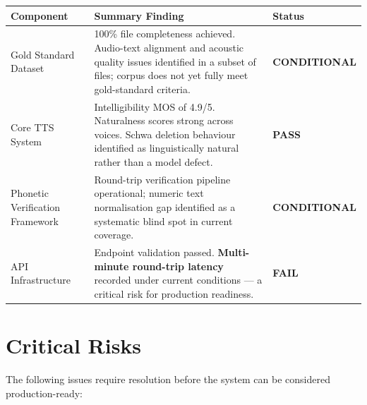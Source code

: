 \documentclass[12pt, a4paper]{article}
\newcommand{\pass}[0]{\textcolor{status-pass}{\textbf{PASS}}}
\newcommand{\conditional}[0]{\textcolor{status-warn}{\textbf{CONDITIONAL}}}
\newcommand{\fail}[0]{\textcolor{status-fail}{\textbf{FAIL}}}
\newcommand{\risk}[1]{\textcolor{status-fail}{\textbf{#1}}}
\begin{document}
\vspace{0.4em}
\begin{center}
\renewcommand{\arraystretch}{1.45}
\begin{tabular}{L{3.8cm} L{6.5cm} C{2.2cm}}
  \toprule
  \textbf{Component} & \textbf{Summary Finding} & \textbf{Status} \\
  \midrule
  Gold Standard Dataset
    & 100\% file completeness achieved. Audio-text alignment and acoustic quality issues identified in a subset of files; corpus does not yet fully meet gold-standard criteria.
    & \conditional \\
  \addlinespace
  Core TTS System
    & Intelligibility MOS of 4.9/5. Naturalness scores strong across voices. Schwa deletion behaviour identified as linguistically natural rather than a model defect.
    & \pass \\
  \addlinespace
  Phonetic Verification Framework
    & Round-trip verification pipeline operational; numeric text normalisation gap identified as a systematic blind spot in current coverage.
    & \conditional \\
  \addlinespace
  API Infrastructure
    & Endpoint validation passed. \risk{Multi-minute round-trip latency} recorded under current conditions — a critical risk for production readiness.
    & \fail \\
  \bottomrule
\end{tabular}
\end{center}

\vspace{0.6em}

\section{Critical Risks}

The following issues require resolution before the system can be considered production-ready:
\end{document}
